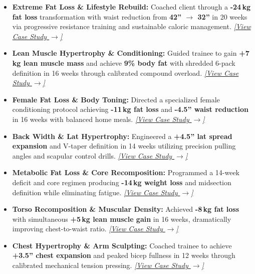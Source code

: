 \documentclass[10pt,a4paper]{article}
\begin{document}
\begin{itemize}
    \item \textbf{Extreme Fat Loss \& Lifestyle Rebuild:} Coached client through a \textbf{-24\,kg fat loss} transformation with waist reduction from \textbf{42'' $\rightarrow$ 32''} in 20 weeks via progressive resistance training and sustainable caloric management. \href{https://suman-deb-fitness-portfolio.vercel.app/?case=trans-3\#results}{\textit{[View Case Study $\rightarrow$]}}

    \item \textbf{Lean Muscle Hypertrophy \& Conditioning:} Guided trainee to gain \textbf{+7\,kg lean muscle mass} and achieve \textbf{9\% body fat} with shredded 6-pack definition in 16 weeks through calibrated compound overload. \href{https://suman-deb-fitness-portfolio.vercel.app/?case=trans-1\#results}{\textit{[View Case Study $\rightarrow$]}}

    \item \textbf{Female Fat Loss \& Body Toning:} Directed a specialized female conditioning protocol achieving \textbf{-11\,kg fat loss} and \textbf{-4.5'' waist reduction} in 16 weeks with balanced home meals. \href{https://suman-deb-fitness-portfolio.vercel.app/?case=trans-2\#results}{\textit{[View Case Study $\rightarrow$]}}

    \item \textbf{Back Width \& Lat Hypertrophy:} Engineered a \textbf{+4.5'' lat spread expansion} and V-taper definition in 14 weeks utilizing precision pulling angles and scapular control drills. \href{https://suman-deb-fitness-portfolio.vercel.app/?case=trans-6\#results}{\textit{[View Case Study $\rightarrow$]}}

    \item \textbf{Metabolic Fat Loss \& Core Recomposition:} Programmed a 14-week deficit and core regimen producing \textbf{-14\,kg weight loss} and midsection definition while eliminating fatigue. \href{https://suman-deb-fitness-portfolio.vercel.app/?case=trans-4\#results}{\textit{[View Case Study $\rightarrow$]}}

    \item \textbf{Torso Recomposition \& Muscular Density:} Achieved \textbf{-8\,kg fat loss} with simultaneous \textbf{+5\,kg lean muscle gain} in 16 weeks, dramatically improving chest-to-waist ratio. \href{https://suman-deb-fitness-portfolio.vercel.app/?case=trans-7\#results}{\textit{[View Case Study $\rightarrow$]}}

    \item \textbf{Chest Hypertrophy \& Arm Sculpting:} Coached trainee to achieve \textbf{+3.5'' chest expansion} and peaked bicep fullness in 12 weeks through calibrated mechanical tension pressing. \href{https://suman-deb-fitness-portfolio.vercel.app/?case=trans-8\#results}{\textit{[View Case Study $\rightarrow$]}}


\end{itemize}
\end{document}
